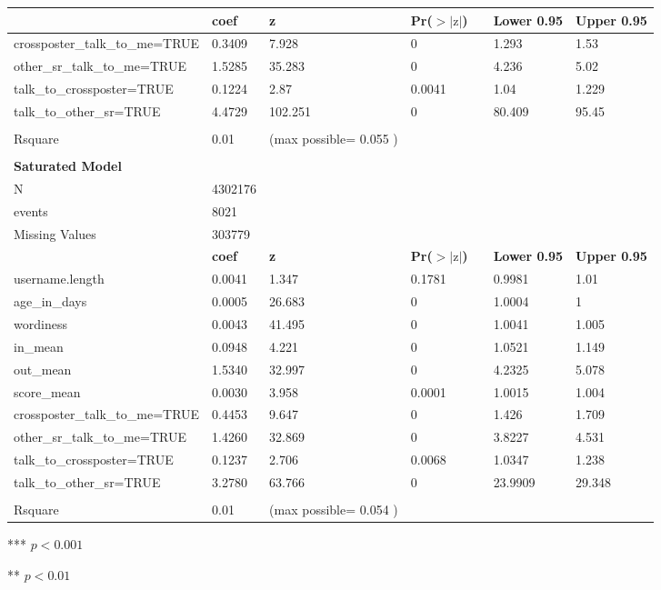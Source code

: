 \documentclass[letterpaper]{article}
\begin{document}
\begin{table*}[]
\begin{threeparttable}
{\begin{tabular}{|l|l|l|l l|l|l|}
    \hline
    & \textbf{coef} & \textbf{z} & \textbf{Pr($>|\text{z}|$)} & \textbf{} & \textbf{Lower 0.95} & \textbf{Upper 0.95} \\ 
    \hline
    crossposter\_talk\_to\_me=TRUE & 0.3409 & 7.928 & 0\tnote{***} &  & 1.293 & 1.53\\ 
    other\_sr\_talk\_to\_me=TRUE & 1.5285 & 35.283 & 0\tnote{***} &  & 4.236 & 5.02\\ 
    talk\_to\_crossposter=TRUE & 0.1224 & 2.87 & 0.0041\tnote{**} &  & 1.04 & 1.229\\ 
    talk\_to\_other\_sr=TRUE & 4.4729 & 102.251 & 0\tnote{***} &  & 80.409 & 95.45 \\ 
    & & & & & & \\ 
    Rsquare & 0.01 & (max possible= 0.055 ) & & & &\\ 
    & & & & & & \\
    \hline
    \hline
    \textbf{Saturated Model} & & & & & & \\ 
    \hline
    \hline
    N & 4302176 & & & & & \\ 
    events & 8021 & & & & & \\ 
    Missing Values & 303779 & & & & &\\ 
    \hline
    & \textbf{coef} & \textbf{z} & \textbf{Pr($>|\text{z}|$)} & \textbf{} & \textbf{Lower 0.95} & \textbf{Upper 0.95} \\ 
    \hline
    username.length & 0.0041 & 1.347 & 0.1781 & & 0.9981 & 1.01 \\ 
    age\_in\_days & 0.0005 & 26.683 & 0\tnote{***} &  & 1.0004 & 1\\ 
    wordiness & 0.0043 & 41.495 & 0 \tnote{***} & & 1.0041 & 1.005 \\ 
    in\_mean & 0.0948 & 4.221 & 0 \tnote{***} &  & 1.0521 & 1.149 \\ 
    out\_mean & 1.5340 & 32.997 & 0\tnote{***} &  & 4.2325 & 5.078 \\ 
    score\_mean & 0.0030 & 3.958 & 0.0001\tnote{***} &  & 1.0015 & 1.004 \\ 
    crossposter\_talk\_to\_me=TRUE & 0.4453 & 9.647 \tnote{***} & 0 & & 1.426 & 1.709 \\ 
    other\_sr\_talk\_to\_me=TRUE & 1.4260 & 32.869 & 0\tnote{***} & & 3.8227 & 4.531 \\ 
    talk\_to\_crossposter=TRUE & 0.1237 & 2.706 & 0.0068\tnote{**} & & 1.0347 & 1.238 \\ 
    talk\_to\_other\_sr=TRUE & 3.2780 & 63.766 & 0\tnote{***} & & 23.9909 & 29.348 \\ 
    & & & & & & \\ 
    Rsquare & 0.01 & (max possible= 0.054 ) & & & &\\
    \hline
    \end{tabular}
    }
    \begin{tablenotes}
        \item[***] $p < 0.001$
        \item[**] $p < 0.01$
    \end{tablenotes}
    \label{tab:regrtab}
    \end{threeparttable}
\end{table*}
\end{document}

